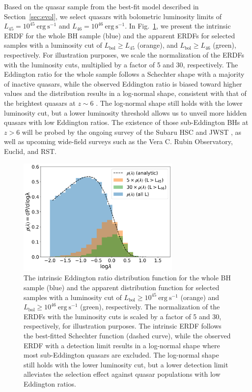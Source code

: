 \documentclass[twocolumn, twocolappendix]{aastex63}
\newcommand{\Lbol}{L_\mathrm{bol}}
\begin{document}
\begin{CJK*}{UTF8}{gbsn}
Based on the quasar sample from the best-fit model described in Section~\ref{sec:evol},
we select quasars with bolometric luminosity limits of $L_{45}=10^{45}~\mathrm{erg~s^{-1}}$ and $L_{46}=10^{46}~\mathrm{erg~s^{-1}}$.
In Fig.~\ref{fig:lhist}, we present the intrinsic ERDF for the whole BH sample (blue)
and the apparent ERDFs for selected samples with a luminosity cut of $\Lbol \geq L_{45}$ (orange),
and $\Lbol \geq L_{46}$ (green), respectively.
For illustration purposes, we scale the normalization of the ERDFs with the luminosity cuts, multiplied by a factor of 5 and 30, respectively.
The Eddington ratio for the whole sample follows a Schechter shape with a majority of inactive quasars,
while the observed Eddington ratio is biased toward higher values and the distribution results in a log-normal shape,
consistent with that of the brightest quasars at $z\sim 6$ \citep[e.g.,][]{2010AJ....140..546W,2019ApJ...873...35S,2021ApJ...923..262Y,2022ApJ...941..106F}.
The log-normal shape still holds with the lower luminosity cut, but a lower luminosity threshold allows us to unveil more hidden quasars with low Eddington ratios.
The existence of those sub-Eddington BHs at $z>6$ will be probed by the ongoing survey of the Subaru HSC and JWST
\citep{2019ApJ...880...77O,2021jwst.prop.1967O}, as well as upcoming wide-field surveys such as the Vera C. Rubin Observatory, Euclid, and RST.


\begin{figure}
\centering
\includegraphics[width=80mm]{l_hist.png}
\caption{
The intrinsic Eddington ratio distribution function for the whole BH sample (blue) and the apparent distribution function for selected samples with
a luminosity cut of $\Lbol \geq 10^{45}~\mathrm{erg~s^{-1}}$ (orange) and $\Lbol \geq 10^{46}~\mathrm{erg~s^{-1}}$ (green), respectively.
The normalization of the ERDFs with the luminosity cuts is scaled by a factor of 5 and 30, respectively, for illustration purposes.
The intrinsic ERDF follows the best-fitted Schechter function (dashed curve),
while the observed ERDF with a detection limit results in a log-normal shape where most sub-Eddington quasars are excluded.
The log-normal shape still holds with the lower luminosity cut, but a lower detection limit alleviates the selection effect against quasar populations with low Eddington ratios.
}
\label{fig:lhist}
\end{figure}
  



\end{CJK*}
\end{document}
